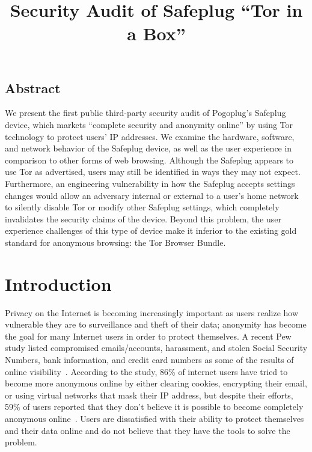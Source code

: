 \documentclass[letterpaper,twocolumn,10pt]{article}
\begin{document}
\date{}

\title{\Large \bf Security Audit of Safeplug ``Tor in a Box''}

\maketitle

\thispagestyle{empty}

\subsection*{Abstract}
We present the first public third-party security audit of Pogoplug's Safeplug device, which markets ``complete security and anonymity online'' by using Tor technology to protect users' IP addresses.  We examine the hardware, software, and network behavior of the Safeplug device, as well as the user experience in comparison to other forms of web browsing.  Although the Safeplug appears to use Tor as advertised, users may still be identified in ways they may not expect.  Furthermore, an engineering vulnerability in how the Safeplug accepts settings changes would allow an adversary internal or external to a user's home network to silently disable Tor or modify other Safeplug settings, which completely invalidates the security claims of the device.  Beyond this problem, the user experience challenges of this type of device make it inferior to the existing gold standard for anonymous browsing: the Tor Browser Bundle.

\setlength{\parskip}{1ex plus 2ex minus 2ex}

\section{Introduction}
Privacy on the Internet is becoming increasingly important as users realize how vulnerable they are to surveillance and theft of their data; anonymity has become the goal for many Internet users in order to protect themselves.  A recent Pew study listed compromised emails/accounts, harassment, and stolen Social Security Numbers, bank information, and credit card numbers as some of the results of online visibility~\cite{pew}.  According to the study, 86\% of internet users have tried to become more anonymous online by either clearing cookies, encrypting their email, or using virtual networks that mask their IP address, but despite their efforts, 59\% of users reported that they don't believe it is possible to become completely anonymous online~\cite{pew}.  Users are dissatisfied with their ability to protect themselves and their data online and do not believe that they have the tools to solve the problem.
\end{document}
